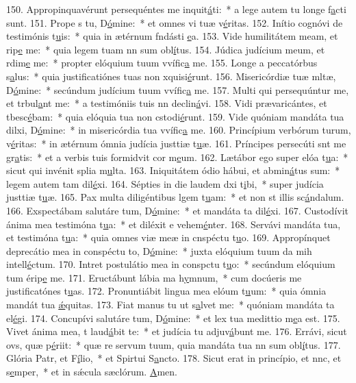 150. Appropinquavérunt persequéntes me inquit\uline{á}ti:~* a lege autem tu longe f\uline{a}cti sunt.
151. Prope s tu, D\uline{ó}mine:~* et omnes vi tuæ v\uline{é}ritas.
152. Inítio cognóvi de testimónis t\uline{u}is:~* quia in ætérnum fndásti \uline{e}a.
153. Vide humilitátem meam, et rip\uline{e} me:~* quia legem tuam nn sum obl\uline{í}tus.
154. Júdica judícium meum, et rdim\uline{e} me:~* propter elóquium tuum vvífic\uline{a} me.
155. Longe a peccatórbus s\uline{a}lus:~* quia justificatiónes tuas non xquisi\uline{é}runt.
156. Misericórdiæ tuæ mltæ, D\uline{ó}mine:~* secúndum judícium tuum vvífic\uline{a} me.
157. Multi qui persequúntur me, et trbul\uline{a}nt me:~* a testimóniis tuis nn declin\uline{á}vi.
158. Vidi prævaricántes, et tbesc\uline{é}bam:~* quia elóquia tua non cstodi\uline{é}runt.
159. Vide quóniam mandáta tua dilxi, D\uline{ó}mine:~* in misericórdia tua vvífic\uline{a} me.
160. Princípium verbórum turum, v\uline{é}ritas:~* in ætérnum ómnia judícia justtiæ t\uline{u}æ.
161. Príncipes persecúti snt me gr\uline{a}tis:~* et a verbis tuis formidvit cor m\uline{e}um.
162. Lætábor ego super elóa t\uline{u}a:~* sicut qui invénit splia m\uline{u}lta.
163. Iniquitátem ódio hábui, et abmin\uline{á}tus sum:~* legem autem tam dil\uline{é}xi.
164. Sépties in die laudem dxi t\uline{i}bi,~* super judícia justtiæ t\uline{u}æ.
165. Pax multa diligéntibus lgem t\uline{u}am:~* et non st illis sc\uline{á}ndalum.
166. Exspectábam salutáre tum, D\uline{ó}mine:~* et mandáta ta dil\uline{é}xi.
167. Custodívit ánima mea testimóna t\uline{u}a:~* et diléxit e vehem\uline{é}nter.
168. Servávi mandáta tua, et testimóna t\uline{u}a:~* quia omnes viæ meæ in cnspéctu t\uline{u}o.
169. Appropínquet deprecátio mea in conspéctu to, D\uline{ó}mine:~* juxta elóquium tuum da mih intell\uline{é}ctum.
170. Intret postulátio mea in conspctu t\uline{u}o:~* secúndum elóquium tum érip\uline{e} me.
171. Eructábunt lábia ma h\uline{y}mnum,~* cum docúeris me justificatónes t\uline{u}as.
172. Pronuntiábit lingua mea elóum t\uline{u}um:~* quia ómnia mandát tua \uline{ǽ}quitas.
173. Fiat manus tu ut s\uline{a}lvet me:~* quóniam mandáta ta el\uline{é}gi.
174. Concupívi salutáre tum, D\uline{ó}mine:~* et lex tua medittio m\uline{e}a est.
175. Vivet ánima mea, t laud\uline{á}bit te:~* et judícia tu adjuv\uline{á}bunt me.
176. Errávi, sicut ovs, quæ p\uline{é}riit:~* quæ re servum tuum, quia mandáta tua nn sum obl\uline{í}tus.
177. Glória Patr, et F\uline{í}lio,~* et Spirtui S\uline{a}ncto.
178. Sicut erat in princípio, et nnc, et s\uline{e}mper,~* et in sǽcula sæclórum. \uline{A}men.
